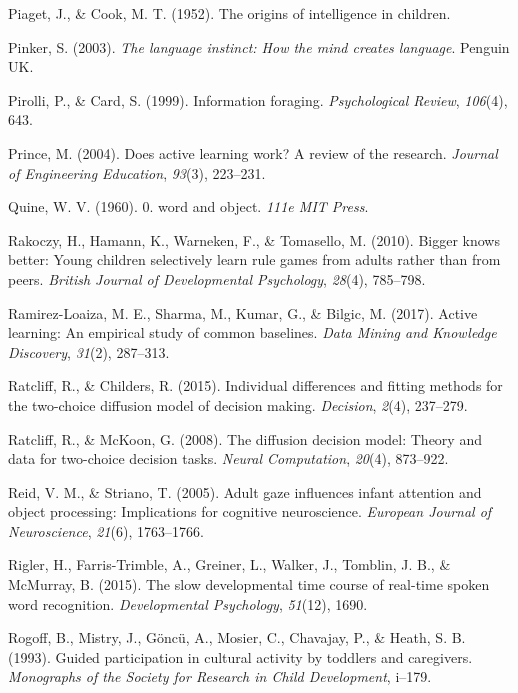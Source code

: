 \documentclass[oneside]{report}
\begin{document}
\hypertarget{ref-piaget1952origins}{}
Piaget, J., \& Cook, M. T. (1952). The origins of intelligence in
children.

\hypertarget{ref-pinker2003language}{}
Pinker, S. (2003). \emph{The language instinct: How the mind creates
language}. Penguin UK.

\hypertarget{ref-pirolli1999information}{}
Pirolli, P., \& Card, S. (1999). Information foraging.
\emph{Psychological Review}, \emph{106}(4), 643.

\hypertarget{ref-prince2004does}{}
Prince, M. (2004). Does active learning work? A review of the research.
\emph{Journal of Engineering Education}, \emph{93}(3), 223--231.

\hypertarget{ref-quine19600}{}
Quine, W. V. (1960). 0. word and object. \emph{111e MIT Press}.

\hypertarget{ref-rakoczy2010bigger}{}
Rakoczy, H., Hamann, K., Warneken, F., \& Tomasello, M. (2010). Bigger
knows better: Young children selectively learn rule games from adults
rather than from peers. \emph{British Journal of Developmental
Psychology}, \emph{28}(4), 785--798.

\hypertarget{ref-ramirez2017active}{}
Ramirez-Loaiza, M. E., Sharma, M., Kumar, G., \& Bilgic, M. (2017).
Active learning: An empirical study of common baselines. \emph{Data
Mining and Knowledge Discovery}, \emph{31}(2), 287--313.

\hypertarget{ref-ratcliff2015individual}{}
Ratcliff, R., \& Childers, R. (2015). Individual differences and fitting
methods for the two-choice diffusion model of decision making.
\emph{Decision}, \emph{2}(4), 237--279.

\hypertarget{ref-ratcliff2008diffusion}{}
Ratcliff, R., \& McKoon, G. (2008). The diffusion decision model: Theory
and data for two-choice decision tasks. \emph{Neural Computation},
\emph{20}(4), 873--922.

\hypertarget{ref-reid2005adult}{}
Reid, V. M., \& Striano, T. (2005). Adult gaze influences infant
attention and object processing: Implications for cognitive
neuroscience. \emph{European Journal of Neuroscience}, \emph{21}(6),
1763--1766.

\hypertarget{ref-rigler2015slow}{}
Rigler, H., Farris-Trimble, A., Greiner, L., Walker, J., Tomblin, J. B.,
\& McMurray, B. (2015). The slow developmental time course of real-time
spoken word recognition. \emph{Developmental Psychology}, \emph{51}(12),
1690.

\hypertarget{ref-rogoff1993guided}{}
Rogoff, B., Mistry, J., Göncü, A., Mosier, C., Chavajay, P., \& Heath,
S. B. (1993). Guided participation in cultural activity by toddlers and
caregivers. \emph{Monographs of the Society for Research in Child
Development}, i--179.
\end{document}
